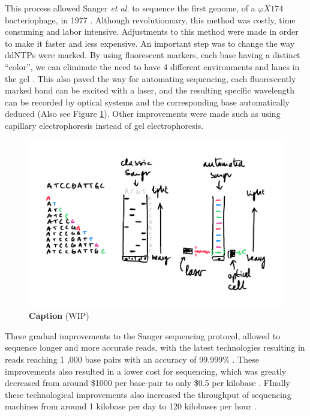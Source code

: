 \documentclass[
  11pt,
  twoside]{scrbook}
\newcommand{\extcaption}[2]{
    \caption[#1]{
        \textbf{#1}\newline
        #2
    }
}
\begin{document}
This process allowed Sanger \emph{et al.} to sequence the first genome, of a \(\varphi X174\) bacteriophage, in 1977 \autocite{sangerNucleotideSequenceBacteriophage1977}. Although revolutionnary, this method was costly, time consuming and labor intensive. Adjustments to this method were made in order to make it faster and less expensive. An important step was to change the way ddNTPs were marked. By using fluorescent markers, each base having a distinct ``color'', we can eliminate the need to have 4 different environments and lanes in the gel \autocite{smithSynthesisOligonucleotidesContaining1985,smithFluorescenceDetectionAutomated1986}. This also paved the way for automating sequencing, each fluorescently marked band can be excited with a laser, and the resulting specific wavelength can be recorded by optical systems and the corresponding base automatically deduced \autocite{ansorgeAutomatedDNASequencing1987} (Also see Figure \ref{fig:sanger}). Other improvements were made such as using capillary electrophoresis instead of gel electrophoresis.

\begin{figure}[h]
\centering
\includegraphics[width=0.6\linewidth]{./figures/Sequence-Intro/sanger-sequencing.pdf}
\extcaption{Caption}{(WIP)}
\label{fig:sanger}
\end{figure}

These gradual improvements to the Sanger sequencing protocol, allowed to sequence longer and more accurate reads, with the latest technologies resulting in reads reaching 1 ,000 base pairs with an accuracy of 99.999\% \autocite{shendureNextgenerationDNASequencing2008}. These improvements also resulted in a lower cost for sequencing, which was greatly decreased from around \$1000 per base-pair \autocite{collinsHumanGenomeProject2003} to only \$0.5 per kilobase \autocite{shendureNextgenerationDNASequencing2008}. FInally these technological improvements also increased the throughput of sequencing machines from around 1 kilobase per day \autocite{collinsHumanGenomeProject2003} to 120 kilobases per hour \autocite{liuComparisonNextGenerationSequencing2012}.
\end{document}
